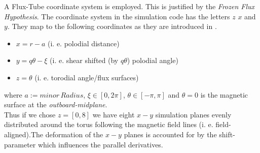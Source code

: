 A Flux-Tube coordinate system is employed. This is justified by the \textit{Frozen Flux Hypothesis}. 
The coordinate system in the simulation code has the letters $z$ $x$ and $y$. They map to the following coordinates as they are introduced in \cite{doi:10.1063/1.1335832}.
\begin{itemize}
    \item $x = r - a$   (i. e. polodial distance)
    \item $y = q\theta - \xi$ (i. e. shear shifted (by $q\theta$) polodial angle)
    \item $z = \theta$ (i. e. torodial angle/flux surfaces)
\end{itemize} 
where $a:=minor\, Radius$, $\xi \in [0,2\pi]$, $\theta \in [-\pi,\pi]$ and $\theta = 0$ is the magnetic surface at the \textit{outboard-midplane}.\\
Thus if we chose $z=[0,8]$ we have eight $x-y$ simulation planes evenly distributed around the torus following the magnetic field lines (i. e. field-aligned).The deformation of the $x-y$ planes is accounted for by the shift-parameter which influences the parallel derivatives.